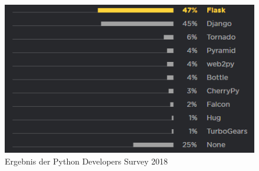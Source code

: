 \documentclass[a4paper,titlepage,halfparskip,12pt]{scrreprt}
\begin{document}
\begin{onehalfspacing}
\begin{figure}[h]
	\centering
	\includegraphics[scale=1.2]{images/FlaskSurvey2018}
	\caption{Ergebnis der Python Developers Survey 2018 \cite{pythonDeveloperSurvey2018}}
	\label{img:StatistikWebFrameworks}
\end{figure}


\end{onehalfspacing}
\end{document}
